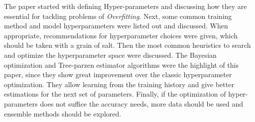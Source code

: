 \documentclass[twoside]{article}
\begin{document}
The paper started with defining Hyper-parameters and discussing how they are essential for tackling problems of \textit{Overfitting}. Next, some common training method and model hyperparameters were listed out and discussed. When appropriate, recommendations for hyperparameter choices were given, which should be taken with a grain of salt. Then the most common heuristics to search and optimize the hyperparameter space were discussed. The Bayesian optimization and Tree-parzen estimator algorithms were the highlight of this paper, since they show great improvement over the classic hyperparameter optimization. They allow learning from the training history and give better estimations for the next set of parameters. Finally, if the optimization of hyper-parameters does not suffice the accuracy needs, more data should be used and ensemble methods should be explored.

\printbibliography
\end{document}
